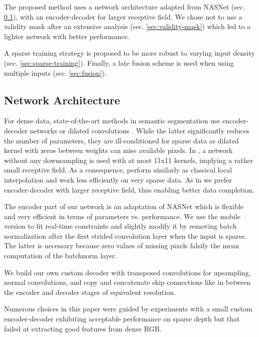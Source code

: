 \documentclass[10pt,twocolumn,letterpaper]{article}
\begin{document}
The proposed method uses a network architecture adapted from NASNet \cite{zoph2017learning} (sec. \ref{sec:net-arch}), with an encoder-decoder for larger receptive field.
We chose not to use a validity mask after an extensive analysis (sec. \ref{sec:validity-mask}) which led to a lighter network with better performance.

A sparse training strategy is proposed to be more robust to varying input density (sec. \ref{sec:sparse-training}). Finally, a late fusion scheme is used when using multiple inputs (sec. \ref{sec:fusion}).\\


\subsection{Network Architecture}
\label{sec:net-arch}

For dense data, state-of-the-art methods in semantic segmentation use encoder-decoder networks or dilated convolutions \cite{chen2018deeplab}. While the latter significantly reduces
the number of parameters, they are ill-conditioned for sparse data as dilated kernel with zeros between weights can miss available pixels. In \cite{uhrig2017sparsity},
a network without any downsampling is used with at most 11x11 kernels, implying a rather small receptive field.
As a consequence, \cite{uhrig2017sparsity} perform similarly as classical local interpolation \cite{ku2018defense} and work less efficiently on very sparse data. As in \cite{ma2018sparse,zhang2018deep} we prefer encoder-decoder with larger receptive field, thus enabling better data completion. 

The encoder part of our network is an adaptation of NASNet \cite{zoph2017learning} which is flexible and very efficient in terms of parameters vs. performance.
We use the mobile version to fit real-time constraints and slightly modify it by removing batch normalization after the first strided convolution layer when the input is sparse.
The latter is necessary because zero values of missing pixels falsify the mean computation of the batchnorm layer.

We build our own custom decoder with transposed convolutions for upsampling, normal convolutions, and copy and concatenate skip connections like in \cite{ronneberger2015u} between the encoder and decoder stages of equivalent resolution.

Numerous choices in this paper were guided by experiments with a small custom encoder-decoder exhibiting acceptable performance on sparse depth but that failed at extracting good features from dense RGB.
\end{document}

